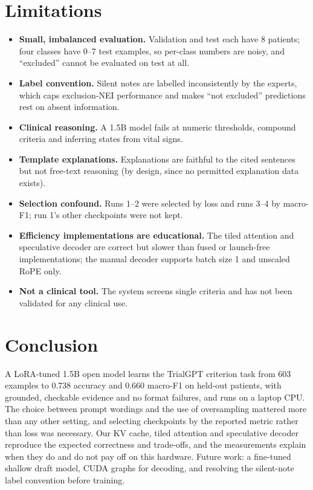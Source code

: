 \documentclass[conference]{IEEEtran}
\begin{document}
\section{Limitations}
\begin{itemize}
\item \textbf{Small, imbalanced evaluation.} Validation and test each have 8 patients; four classes have 0--7 test examples, so per-class numbers are noisy, and ``excluded'' cannot be evaluated on test at all.
\item \textbf{Label convention.} Silent notes are labelled inconsistently by the experts, which caps exclusion-NEI performance and makes ``not excluded'' predictions rest on absent information.
\item \textbf{Clinical reasoning.} A 1.5B model fails at numeric thresholds, compound criteria and inferring states from vital signs.
\item \textbf{Template explanations.} Explanations are faithful to the cited sentences but not free-text reasoning (by design, since no permitted explanation data exists).
\item \textbf{Selection confound.} Runs 1--2 were selected by loss and runs 3--4 by macro-F1; run 1's other checkpoints were not kept.
\item \textbf{Efficiency implementations are educational.} The tiled attention and speculative decoder are correct but slower than fused or launch-free implementations; the manual decoder supports batch size 1 and unscaled RoPE only.
\item \textbf{Not a clinical tool.} The system screens single criteria and has not been validated for any clinical use.
\end{itemize}

\section{Conclusion}
A LoRA-tuned 1.5B open model learns the TrialGPT criterion task from 603 examples to 0.738 accuracy and 0.660 macro-F1 on held-out patients, with grounded, checkable evidence and no format failures, and runs on a laptop CPU. The choice between prompt wordings and the use of oversampling mattered more than any other setting, and selecting checkpoints by the reported metric rather than loss was necessary. Our KV cache, tiled attention and speculative decoder reproduce the expected correctness and trade-offs, and the measurements explain when they do and do not pay off on this hardware. Future work: a fine-tuned shallow draft model, CUDA graphs for decoding, and resolving the silent-note label convention before training.
\end{document}
